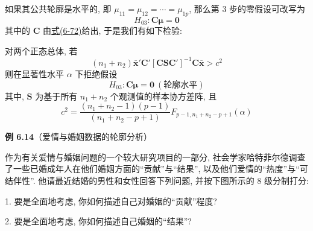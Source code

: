 如果其公共轮廓是水平的, 即 $\mu_{11}=\mu_{12}=\cdots=\mu_{1p}$, 那么第 3 步的零假设可改写为
\[
H_{03}: \mathbf{C}\boldsymbol{\mu}=\mathbf{0}
\]
其中的 $\mathbf{C}$ 由\hyperref[eq:6-72]{式(6-72)}给出, 于是我们有如下检验:

\begin{mvframe}

对两个正态总体, 若
\label{eq:6-75}
\begin{equation}
(n_1+n_2)\bar{\mathbf{x}}'\mathbf{C}'[\mathbf{C}\mathbf{S}\mathbf{C}']^{-1}\mathbf{C}\bar{\mathbf{x}}>c^2 \tag{6-75}
\end{equation}
则在显著性水平 $\alpha$ 下拒绝假设
\[
H_{03}: \mathbf{C}\boldsymbol{\mu}=\mathbf{0}\ (\text{轮廓水平})
\]
其中, $\mathbf{S}$ 为基于所有 $n_1+n_2$ 个观测值的样本协方差阵, 且
\[
c^2=\frac{(n_1+n_2-1)(p-1)}{(n_1+n_2-p+1)}F_{p-1,n_1+n_2-p+1}(\alpha)
\]
\end{mvframe}

\medskip
\noindent\textbf{例 6.14}\quad （爱情与婚姻数据的轮廓分析）

作为有关爱情与婚姻问题的一个较大研究项目的一部分, 社会学家哈特菲尔德调查了一些已婚成年人在他们婚姻方面的“贡献”与“结果”, 以及他们爱情的“热度”与“可结伴性”. 他请最近结婚的男性和女性回答下列问题, 并按下图所示的 8 级分制打分:

1. 要是全面地考虑, 你如何描述自己对婚姻的“贡献”程度?

2. 要是全面地考虑, 你如何描述自己婚姻的“结果”?

\begin{mvfigure}
\end{mvfigure}

